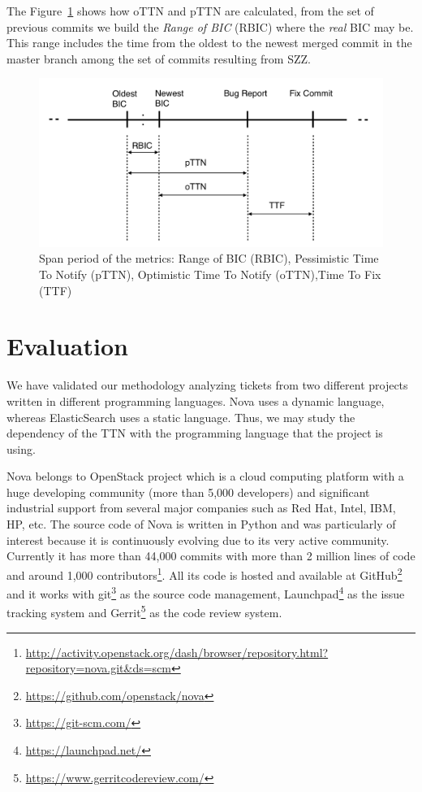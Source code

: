 \documentclass[10pt, conference]{IEEEtran}
\begin{document}

The Figure~\ref{fig:SZZmetrics} shows how oTTN and pTTN are calculated, from the set of previous commits we build the \emph{Range of BIC} (RBIC) where the \emph{real} BIC may be. This range includes the time from the oldest to the newest merged commit in the master branch among the set of commits resulting from SZZ.
  
\begin{figure}[ht]
\centering
\includegraphics[width=\columnwidth]{SZZmetrics.png}
\caption{ Span period of the metrics: Range of BIC (RBIC),  Pessimistic Time To Notify (pTTN), Optimistic Time To Notify (oTTN),Time To Fix (TTF) }
\label{fig:SZZmetrics}       %
\end{figure}

\section{Evaluation}
\label{sec:evaluation}

We have validated our methodology analyzing tickets from two different projects written in different programming languages. Nova uses a dynamic language, whereas ElasticSearch uses a static language. Thus, we may study the dependency of the TTN with the programming language that the project is using.

Nova belongs to OpenStack project which is a cloud computing platform with a huge developing community (more than 5,000 developers) and significant industrial support from several major companies such as Red Hat, Intel, IBM, HP, etc. The source code of Nova is written in Python and was particularly of interest because it is continuously evolving due to its very active community. Currently it has more than 44,000 commits with more than 2 million lines of code and around 1,000 contributors\footnote{\url{http://activity.openstack.org/dash/browser/repository.html?repository=nova.git&ds=scm}}. All its code is hosted and available at GitHub\footnote{\url{https://github.com/openstack/nova}} and it works with git\footnote{\url{https://git-scm.com/}} as the source code management, Launchpad\footnote{\url{https://launchpad.net/}} as the issue tracking system and Gerrit\footnote{\url{https://www.gerritcodereview.com/}} as the code review system.
\end{document}
